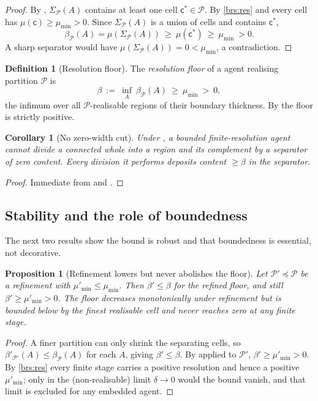 \documentclass[11pt,a4paper]{article}
\theoremstyle{thmstyle}
\newtheorem{proposition}[theorem]{Proposition}
\newtheorem{corollary}[theorem]{Corollary}
\theoremstyle{definition}
\newtheorem{definition}[theorem]{Definition}
\theoremstyle{remark}
\newcommand{\thick}{\beta}
\newcommand{\reso}{\delta}
\newcommand{\Part}{\mathscr{P}}
\newcommand{\cell}{\mathsf{c}}
\begin{document}
\begin{proof}
By , $\Sigma_\Part(A)$ contains at least one cell
$\cell^\ast\in\Part$. By \ref{brs:res} and  every cell
has $\mu(\cell)\ge\mu_{\min}>0$. Since $\Sigma_\Part(A)$ is a union of cells and
contains $\cell^\ast$,
\[
\thick_\Part(A)=\mu(\Sigma_\Part(A))\ \ge\ \mu(\cell^\ast)\ \ge\ \mu_{\min}\ >0 .
\]
A sharp separator would have $\mu(\Sigma_\Part(A))=0<\mu_{\min}$, a
contradiction.
\end{proof}

\begin{definition}[Resolution floor]
\label{def:floor}
The \emph{resolution floor} of a agent realising partition $\Part$ is
\[
\thick\ :=\ \inf_{A}\ \thick_\Part(A)\ \ge\ \mu_{\min}\ >\ 0,
\]
the infimum over all $\Part$-realisable regions of their boundary thickness. By
 the floor is strictly positive.
\end{definition}

\begin{corollary}[No zero-width cut]
\label{cor:no-zero-cut}
Under , a bounded finite-resolution agent cannot divide a
connected whole into a region and its complement by a separator of zero content.
Every division it performs deposits content $\ge\thick$ in the separator.
\end{corollary}

\begin{proof}
Immediate from  and .
\end{proof}

\subsection{Stability and the role of boundedness}

The next two results show the bound is robust and that boundedness is essential,
not decorative.

\begin{proposition}[Refinement lowers but never abolishes the floor]
\label{prop:refine}
Let $\Part'\preceq\Part$ be a refinement with $\mu'_{\min}\le\mu_{\min}$. Then
$\thick'\le\thick$ for the refined floor, and still $\thick'\ge\mu'_{\min}>0$.
The floor decreases monotonically under refinement but is bounded below by the
finest realisable cell and never reaches zero at any finite stage.
\end{proposition}

\begin{proof}
A finer partition can only shrink the separating cells, so
$\thick'_{\Part'}(A)\le\thick_\Part(A)$ for each $A$, giving $\thick'\le\thick$.
By  applied to $\Part'$, $\thick'\ge\mu'_{\min}>0$. By
\ref{brs:res} every finite stage carries a positive resolution and hence a
positive $\mu'_{\min}$; only in the (non-realisable) limit $\reso\to0$ would the
bound vanish, and that limit is excluded for any embedded agent.
\end{proof}
\end{document}
